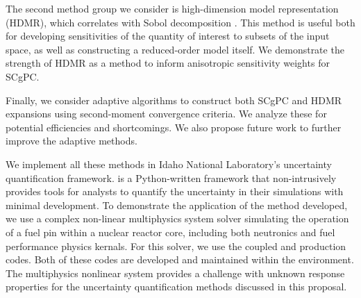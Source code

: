 The second method group we consider is high-dimension model representation (HDMR), which correlates with Sobol
decomposition \cite{hdmr}.  This method is useful both for developing sensitivities of the quantity of interest to subsets
of the input space, as well as constructing a reduced-order model itself.  We demonstrate the strength of HDMR
as a method to inform anisotropic sensitivity weights for SCgPC.

Finally, we consider adaptive algorithms to construct both SCgPC and HDMR expansions using second-moment
convergence criteria.  We analyze these for potential efficiencies and shortcomings.  We also propose future
work to further improve the adaptive methods.

We implement all these methods in Idaho National Laboratory's \raven{}\cite{raven}
uncertainty quantification framework. \raven{} is a Python-written framework that non-intrusively provides
tools for analysts to quantify the uncertainty in their simulations with minimal development.  To demonstrate
the application of the method developed, we use a complex non-linear multiphysics system solver simulating
the operation of a fuel pin within a nuclear reactor core, including both neutronics and fuel performance
physics kernals.  For this solver, we use the coupled \rattlesnake{}\cite{rattlesnake} and 
\bison{} \cite{bison,mammoth} production codes.
Both of these codes are developed and maintained within the \moose{}\cite{moose} environment.  The
multiphysics nonlinear system provides a challenge with unknown response properties for the uncertainty
quantification methods discussed in this proposal.

